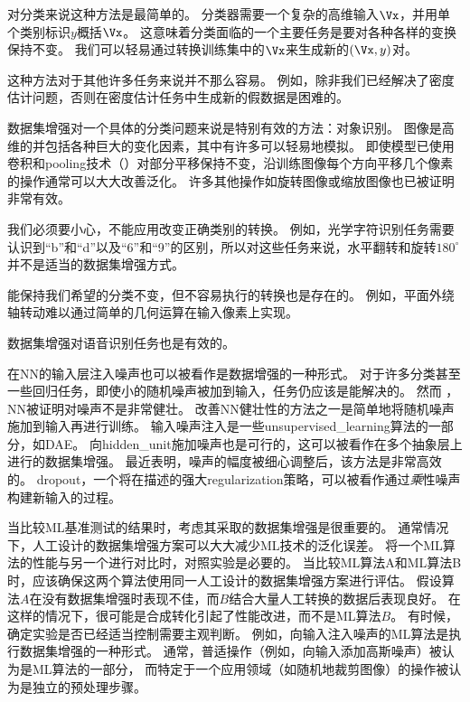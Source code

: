 对分类来说这种方法是最简单的。
分类器需要一个复杂的高维输入$\Vx$，并用单个类别标识$y$概括$\Vx$。
这意味着分类面临的一个主要任务是要对各种各样的变换保持不变。
我们可以轻易通过转换训练集中的$\Vx$来生成新的$(\Vx, y)$对。

这种方法对于其他许多任务来说并不那么容易。
例如，除非我们已经解决了密度估计问题，否则在密度估计任务中生成新的假数据是困难的。

数据集增强对一个具体的分类问题来说是特别有效的方法：对象识别。
图像是高维的并包括各种巨大的变化因素，其中有许多可以轻易地模拟。
即使模型已使用卷积和\gls{pooling}技术（）对部分平移保持不变，沿训练图像每个方向平移几个像素的操作通常可以大大改善泛化。
许多其他操作如旋转图像或缩放图像也已被证明非常有效。

我们必须要小心，不能应用改变正确类别的转换。
例如，光学字符识别任务需要认识到``b''和``d''以及``6''和``9''的区别，所以对这些任务来说，水平翻转和旋转$180^{\circ}$并不是适当的数据集增强方式。


能保持我们希望的分类不变，但不容易执行的转换也是存在的。
例如，平面外绕轴转动难以通过简单的几何运算在输入像素上实现。

数据集增强对语音识别任务也是有效的\citep{Jaitly_VTLP_2013}。

在\gls{NN}的输入层注入噪声\citep{SietsmaDow91}也可以被看作是数据增强的一种形式。
对于许多分类甚至一些回归任务，即使小的随机噪声被加到输入，任务仍应该是能解决的。
然而 ，\gls{NN}被证明对噪声不是非常健壮\citep{TangElias10}。
改善\gls{NN}健壮性的方法之一是简单地将随机噪声施加到输入再进行训练。
输入噪声注入是一些\gls{unsupervised_learning}算法的一部分，如\gls{DAE}\citep{VincentPLarochelleH2008}。
向\gls{hidden_unit}施加噪声也是可行的，这可以被看作在多个抽象层上进行的数据集增强。
\cite{Poole14}最近表明，噪声的幅度被细心调整后，该方法是非常高效的。
\gls{dropout}，一个将在描述的强大\gls{regularization}策略，可以被看作通过\emph{乘}性噪声构建新输入的过程。

当比较\gls{ML}基准测试的结果时，考虑其采取的数据集增强是很重要的。
通常情况下，人工设计的数据集增强方案可以大大减少\gls{ML}技术的泛化误差。
将一个\gls{ML}算法的性能与另一个进行对比时，对照实验是必要的。
当比较\gls{ML}算法A和\gls{ML}算法B时，应该确保这两个算法使用同一人工设计的数据集增强方案进行评估。
假设算法$A$在没有数据集增强时表现不佳，而$B$结合大量人工转换的数据后表现良好。
在这样的情况下，很可能是合成转化引起了性能改进，而不是\gls{ML}算法$B$。 
有时候，确定实验是否已经适当控制需要主观判断。
例如，向输入注入噪声的\gls{ML}算法是执行数据集增强的一种形式。
通常，普适操作（例如，向输入添加高斯噪声）被认为是\gls{ML}算法的一部分，
而特定于一个应用领域（如随机地裁剪图像）的操作被认为是独立的预处理步骤。

